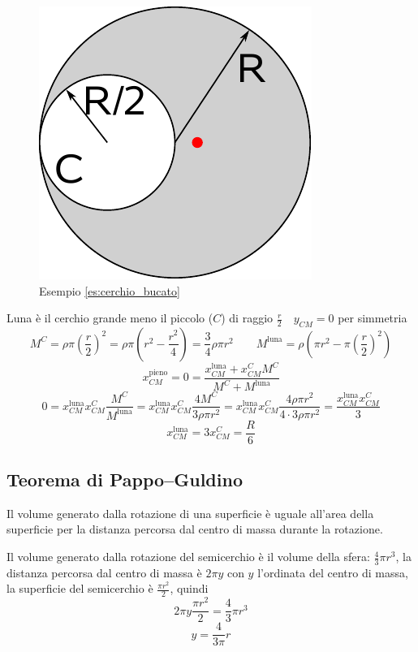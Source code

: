 \begin{Es}
\label{es:cerchio_bucato}
\begin{figure}[htp]
 \centering
 \includegraphics[scale=0.7]{immagini/fisica1/luna}
 \caption{Esempio \ref{es:cerchio_bucato}}
\end{figure}

Luna è il cerchio grande meno il piccolo ($C$) di raggio
$\frac{r}{2} \quad y_{CM}=0$ per simmetria
\[M^C=\rho\pi\left(\frac{r}{2}\right)^2=\rho\pi\left(r^2-\frac{r^2}{4}\right)=\frac{3}{4}\rho\pi r^2\qquad M^{\text{luna}}=\rho\left(\pi r^2-\pi\left(\frac{r}{2}\right)^2\right)\]
\[x_{CM}^{\text{pieno}}=0=\frac{x_{CM}^{\text{luna}}+x_{CM}^CM^C}{M^C+M^{\text{luna}}}\]
\[0=x_{CM}^{\text{luna}}x_{CM}^C\frac{M^C}{M^{\text{luna}}}=x_{CM}^{\text{luna}}x_{CM}^C\frac{4M^C}{3\rho \pi r^2}=x_{CM}^{\text{luna}}x_{CM}^C\frac{4\rho\pi r^2}{4\cdot 3\rho\pi r^2}=\frac{x_{CM}^{\text{luna}}x_{CM}^C}{3}\]
\[x_{CM}^{\text{luna}}=3x_{CM}^C=\frac{R}{6}\]
\end{Es}

\subsection{Teorema di Pappo--Guldino}
\begin{Teo}
Il volume generato dalla rotazione di una superficie è uguale
all'area della superficie per la distanza percorsa dal centro di
massa durante la rotazione.
\end{Teo}
\begin{Es}[Semicerchio]
Il volume generato dalla rotazione del semicerchio è il volume della
sfera: $\frac{4}{3}\pi r^3$, la distanza percorsa dal centro di
massa è $2\pi y$ con $y$ l'ordinata del centro di massa, la
superficie del semicerchio è $\frac{\pi r^2}{2}$, quindi
\[2\pi y\frac{\pi r^2}{2}=\frac{4}{3}\pi r^3\]
\[y=\frac{4}{3\pi}r\]
\end{Es}

